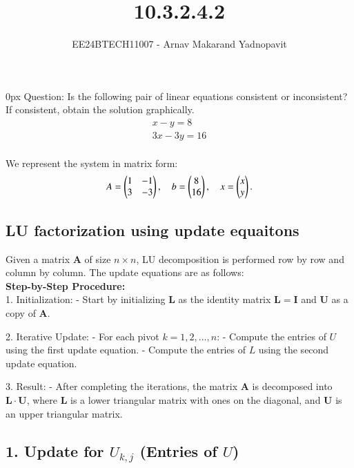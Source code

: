 \documentclass[journal,12pt,onecolumn]{IEEEtran}
\theoremstyle{remark}
\begin{document}
\title{10.3.2.4.2}
\author{EE24BTECH11007 - Arnav Makarand Yadnopavit}
\maketitle
\renewcommand{\thefigure}{\theenumi}
\renewcommand{\thetable}{\theenumi}
\parindent 0px Question: Is the following pair of linear equations consistent or inconsistent? If
consistent, obtain the solution graphically.
\begin{align*}
    x-y=8\\
    3x-3y=16
\end{align*}
\solution\\

We represent the system in matrix form:
\begin{align}
A = \begin{pmatrix}1 & -1 \\ 3 & -3\end{pmatrix}, \quad
b = \begin{pmatrix}8 \\ 16\end{pmatrix}, \quad
x = \begin{pmatrix}x \\ y\end{pmatrix}.
\end{align}

\subsection*{LU factorization using update equaitons}
    Given a matrix $ \mathbf{A} $ of size $ n \times n $, LU decomposition is performed row by row and column by column. The update equations are as follows:\\
    \textbf{Step-by-Step Procedure:}\\
1. Initialization: 
   - Start by initializing $ \mathbf{L} $ as the identity matrix $ \mathbf{L} = \mathbf{I} $ and $ \mathbf{U} $ as a copy of $ \mathbf{A} $.
   
2. Iterative Update:
   - For each pivot $ k = 1, 2, \ldots, n $:
     - Compute the entries of $ U $ using the first update equation.
     - Compute the entries of $ L $ using the second update equation.
   
3. Result:
   - After completing the iterations, the matrix $ \mathbf{A} $ is decomposed into $ \mathbf{L} \cdot \mathbf{U} $, where $ \mathbf{L} $ is a lower triangular matrix with ones on the diagonal, and $ \mathbf{U} $ is an upper triangular matrix.

    

\subsection*{1. Update for $ U_{k,j} $ (Entries of $ U $)}
\end{document}
